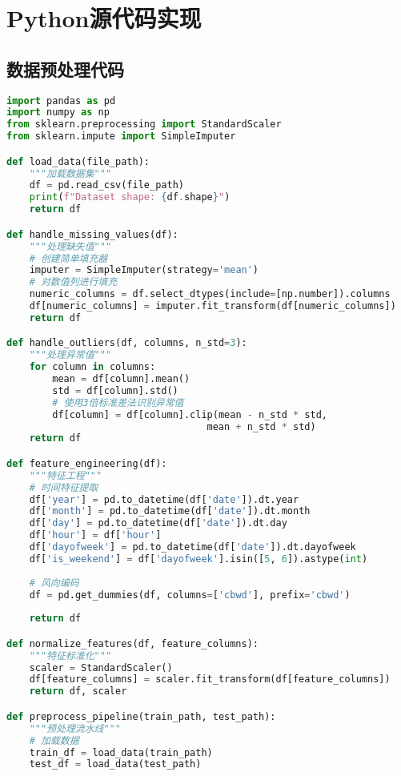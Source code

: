 \appendix
\section{Python源代码实现}

\subsection{数据预处理代码}
\begin{lstlisting}[language=Python, caption=数据预处理实现, label=lst:preprocessing]
import pandas as pd
import numpy as np
from sklearn.preprocessing import StandardScaler
from sklearn.impute import SimpleImputer

def load_data(file_path):
    """加载数据集"""
    df = pd.read_csv(file_path)
    print(f"Dataset shape: {df.shape}")
    return df

def handle_missing_values(df):
    """处理缺失值"""
    # 创建简单填充器
    imputer = SimpleImputer(strategy='mean')
    # 对数值列进行填充
    numeric_columns = df.select_dtypes(include=[np.number]).columns
    df[numeric_columns] = imputer.fit_transform(df[numeric_columns])
    return df

def handle_outliers(df, columns, n_std=3):
    """处理异常值"""
    for column in columns:
        mean = df[column].mean()
        std = df[column].std()
        # 使用3倍标准差法识别异常值
        df[column] = df[column].clip(mean - n_std * std, 
                                   mean + n_std * std)
    return df

def feature_engineering(df):
    """特征工程"""
    # 时间特征提取
    df['year'] = pd.to_datetime(df['date']).dt.year
    df['month'] = pd.to_datetime(df['date']).dt.month
    df['day'] = pd.to_datetime(df['date']).dt.day
    df['hour'] = df['hour']
    df['dayofweek'] = pd.to_datetime(df['date']).dt.dayofweek
    df['is_weekend'] = df['dayofweek'].isin([5, 6]).astype(int)
    
    # 风向编码
    df = pd.get_dummies(df, columns=['cbwd'], prefix='cbwd')
    
    return df

def normalize_features(df, feature_columns):
    """特征标准化"""
    scaler = StandardScaler()
    df[feature_columns] = scaler.fit_transform(df[feature_columns])
    return df, scaler

def preprocess_pipeline(train_path, test_path):
    """预处理流水线"""
    # 加载数据
    train_df = load_data(train_path)
    test_df = load_data(test_path)
    

\end{lstlisting}
